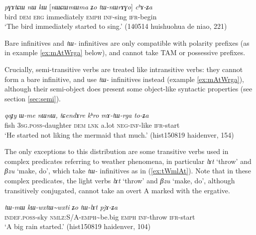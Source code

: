 \documentclass[oneside,a4paper,11pt]{article}
\newcommand{\ipa}[1]{\textit{\phon#1}}
\newcommand{\jpg}[2]{\ipa{#1} `#2'}
\newcommand{\tld}{\textasciitilde{}}
\begin{document}
\begin{exe}
\ex \label{ex:tWnWrAGo}
\gll \ipa{pɣɤtɕɯ} 	\ipa{nɯ} 	\ipa{kɯ} 	[\ipa{nɯɕɯmɯma} 	\ipa{ʑo} 	\ipa{tɯ-nɯrɤɣo}] 	\ipa{cʰɤ-ʑa} \\
bird \textsc{dem} \textsc{erg} immediately \textsc{emph} \textsc{inf}-sing \textsc{ifr}-begin \\
\glt `The bird immediately started to sing.' (140514 huishuohua de niao, 221)
\end{exe}

Bare infinitives and  \ipa{tɯ-} infinitives are only compatible with polarity prefixes (as in example \ref{ex:mAtWrga} below), and cannot take TAM or possessive prefixes.

Crucially, semi-transitive verbs are treated like intransitive verbs: they cannot form a bare infinitive, and use \ipa{tɯ-} infinitives instead (example \ref{ex:mAtWrga}), although their semi-object does present some object-like syntactic properties (see section \ref{sec:semi}).  

\begin{exe}
\ex  \label{ex:mAtWrga}
\gll \ipa{qaɟy} 	\ipa{ɯ-me} 	\ipa{nɯnɯ,} 	\ipa{tɕendɤre} 	\ipa{kʰro} 	\ipa{mɤ-tɯ-rga} 	\ipa{to-ʑa} \\
fish \textsc{3sg.poss}-daughter \textsc{dem} \textsc{lnk} a.lot \textsc{neg-inf}-like \textsc{ifr}-start \\
\glt `He started not liking the mermaid that much.' (hist150819 haidenver, 154)
\end{exe}
 
The only exceptions to this distribution are some transitive verbs used in complex predicates referring to weather phenomena, in particular \jpg{lɤt}{throw} and \jpg{βzu}{make, do}, which take \ipa{tɯ-} infinitives as in (\ref{ex:tWmlAt}). 
Note that in these complex predicates, the light verbs \jpg{lɤt}{throw} and \jpg{βzu}{make, do}, although transitively conjugated, cannot take an overt A marked with the ergative.
 
\begin{exe}
\ex  \label{ex:tWmlAt}
\gll
\ipa{tɯ-mɯ} 	\ipa{kɯ-wxtɯ\tld{}wxti} 	\ipa{ʑo} 	\ipa{tɯ-lɤt} 	\ipa{pjɤ-ʑa} \\
\textsc{indef.poss}-sky \textsc{nmlz:S/A-emph}\tld{}be.big \textsc{emph} \textsc{inf}-throw \textsc{ifr}-start \\
\glt `A big rain started.' (hist150819 haidenver, 104)
\end{exe}

\end{document}
